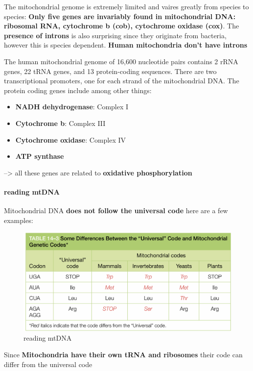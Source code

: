 \documentclass[../main.tex]{subfiles}
\begin{document}
The mitochondrial genome is extremely limited and vaires greatly from species to species:  \textbf{Only five genes are invariably found in mitochondrial DNA: ribosomal RNA, cytochrome b (cob), cytochrome oxidase (cox)}. The\textbf{ presence of introns} is also surprising since they originate from bacteria, however this is species dependent. \textbf{Human mitochondria don't have introns}
\par
The human mitochondrial genome of 16,600 
nucleotide pairs contains 2 rRNA genes, 
22 tRNA genes, and 13 protein-coding 
sequences. There are two transcriptional 
promoters, one for each strand of the 
mitochondrial DNA. The protein coding genes include among other things:
\begin{itemize}
    \item \textbf{NADH dehydrogenase}: Complex I
    \item \textbf{Cytochrome b}: Complex III
    \item \textbf{Cytochrome oxidase}: Complex IV
    \item \textbf{ATP synthase}
\end{itemize}
--> all these genes are related to \textbf{oxidative phosphorylation}
\paragraph{reading mtDNA}
Mitochondrial DNA \textbf{does not follow the universal code} here are a few examples:
\begin{figure}[H]
    \centering
    \includegraphics[width=\linewidth]{readingMtDNA.png}
    \caption{reading mtDNA}
    \label{fig:enter-label}
\end{figure}
Since\textbf{ Mitochondria have their own tRNA and ribosomes }their code can differ from the universal code
\end{document}
